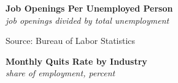 \documentclass{report}
\makeatletter
\newcommand{\tbllink}[1]{\href{https://raw.githubusercontent.com/bdecon/US-chartbook/master/chartbook/data/#1}{\faTable}}
\newcommand*\short[1]{\expandafter\@gobbletwo\number\numexpr#1\relax}
\newcommand{\dateaxisticks}{
		date coordinates in=x, axis line style={draw=none},
		xmax={2024-01-31},
		max space between ticks=40,	    
		xtick={{1990-01-01}, {1992-01-01}, {1994-01-01}, 
			{1996-01-01}, {1998-01-01}, {2000-01-01}, 
			{2002-01-01}, {2004-01-01}, {2006-01-01},
			{2008-01-01}, {2010-01-01}, {2012-01-01}, {2014-01-01},
		    {2016-01-01}, {2018-01-01}, {2020-01-01}, {2022-01-01}, 
		    {2024-01-01}, {2026-01-01}},
		minor xtick={{1989-01-01}, {1991-01-01}, {1993-01-01},
			{1995-01-01}, {1997-01-01}, {1999-01-01}, 
			{2001-01-01}, {2003-01-01}, {2005-01-01}, {2007-01-01},
		    {2009-01-01}, {2011-01-01}, {2013-01-01}, {2015-01-01},
		    {2017-01-01}, {2019-01-01}, {2021-01-01}, {2023-01-01}, 
		    {2025-01-01}, {2027-01-01}},
		enlarge y limits={0.06}, enlarge x limits={0.01},
		xticklabel style={align=center, yshift=-2pt}, tick label style={inner sep=0pt},
		}
\newcommand{\bbar}[2]{extra #1 ticks = {{#2}}, extra #1 tick labels = ,
		extra #1 tick style = {grid=major, grid style={thick, black!25}},}
\newcommand{\thickline}[4]{\addplot[ultra thick, no markers, color=#1] 
		table [x=#2, y=#3, col sep=comma] {#4};	}
\newcommand{\rebars}{
		\fill[color=black!10] (axis cs:{2007-12-01},\pgfkeysvalueof{/pgfplots/ymin}) 
			rectangle (axis cs:{2009-07-01}, \pgfkeysvalueof{/pgfplots/ymax});
		\fill[color=black!10] (axis cs:{2001-03-01},\pgfkeysvalueof{/pgfplots/ymin}) 
			rectangle (axis cs:{2001-11-01}, \pgfkeysvalueof{/pgfplots/ymax});
		\fill[color=black!10] (axis cs:{2020-02-01},\pgfkeysvalueof{/pgfplots/ymin}) 
			rectangle (axis cs:{2020-05-01}, \pgfkeysvalueof{/pgfplots/ymax});}
\makeatother
\begin{document}
{\begin{minipage}{1.0\textwidth}
\normalsize \textbf{Job Openings Per Unemployed Person}\\
\footnotesize{\textit{job openings divided by total unemployment}}
\vspace{2.4cm}

\hspace{2mm} 

\footnotesize{Source: Bureau of Labor Statistics} \hfill \tbllink{unjo.csv}
\end{minipage}
\vspace{5mm}

\begin{minipage}{0.41\textwidth}
\noindent \normalsize \textbf{Monthly Quits Rate by Industry}\\
\footnotesize{\textit{share of employment, percent}}\\
\vspace{11.4cm}


\end{minipage}}
\end{document}

